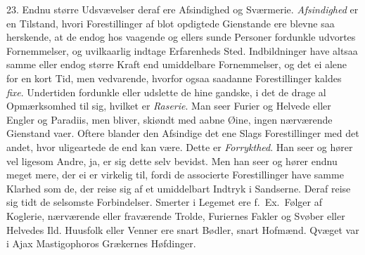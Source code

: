 \documentclass[12pt,a4paper]{article}
\newcommand{\opage}[1]{\marginnote{\footnotesize\textit{[#1]}}}
\begin{document}
23. Endnu større Udsvævelser deraf ere Afsindighed og Sværmerie. \emph{Afsindighed} er en
Tilstand, hvori Forestillinger af blot opdigtede Gienstande ere blevne saa herskende, at
de endog hos vaagende og ellers sunde Personer fordunkle udvortes Fornemmelser, og
\opage{138} uvilkaarlig indtage Erfarenheds Sted. Indbildninger have altsaa samme eller endog større
Kraft end umiddelbare Fornemmelser, og det ei alene for en kort Tid, men vedvarende,
hvorfor ogsaa saadanne Forestillinger kaldes \emph{fixe}. Undertiden fordunkle eller
udslette de hine gandske, i det de drage al Opmærksomhed til sig, hvilket er
\emph{Raserie}. Man seer Furier og Helvede eller Engler og Paradiis, men bliver, skiøndt
med aabne Øine, ingen nærværende Gienstand vaer. Oftere blander den Afsindige det ene
Slags Forestillinger med det andet, hvor uligeartede de end kan være. Dette er
\emph{Forrykthed}. Han seer og hører vel ligesom Andre, ja, er sig dette selv bevidst. Men
han seer og hører endnu meget mere, der ei er virkelig til, fordi de associerte
Forestillinger have samme Klarhed som de, der reise sig af et umiddelbart Indtryk i
Sandserne. Deraf reise sig tidt de selsomste Forbindelser. Smerter i Legemet ere f.~Ex.\
Følger af Koglerie, nærværende eller fraværende Trolde, Furiernes Fakler og Svøber eller
Helvedes Ild. Huusfolk eller Venner ere snart Bødler, snart Hofmænd. Qvæget var i Ajax
Mastigophoros Grækernes Høfdinger.
\end{document}
